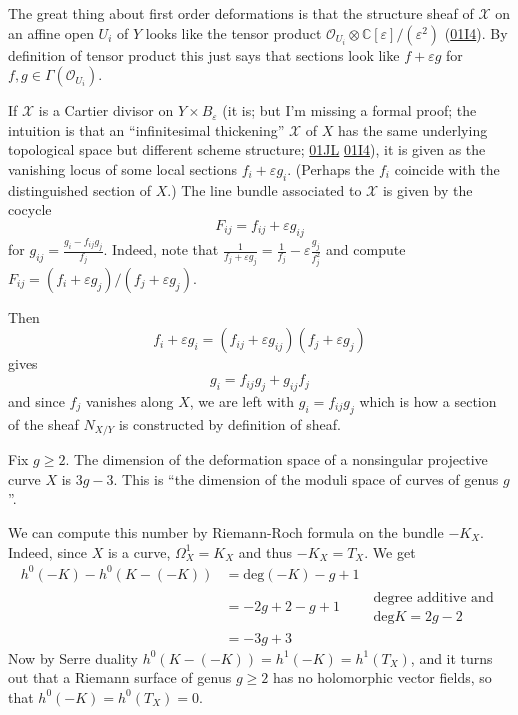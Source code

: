 The great thing about first order
deformations
is that the structure sheaf of $\mathcal{X}$
on an affine open $U_i$ of $Y$
looks like the tensor product
$\mathcal{O}_{U_i}\otimes
\mathbb{C}[\varepsilon]/(\varepsilon^2)$
(\href{https://stacks.math.columbia.edu/tag/%
01I4}{01I4}).
By definition of tensor product this just
says
that sections look like $f+\varepsilon g$
for $f,g \in \Gamma(\mathcal{O}_{U_i})$.

If $\mathcal{X}$ is a Cartier divisor on $Y
\times B_\varepsilon$
(it is; but I'm missing a formal proof;
the intuition is that an ``infinitesimal
thickening'' $\mathcal{X}$
of $X$ has the same underlying topological
space
but different scheme structure;
\href{https://stacks.math.columbia.edu/tag/%
01JL}{01JL}
\href{https://stacks.math.columbia.edu/tag/%
01I4}{01I4}),
it is given as the vanishing locus
of some local sections $f_i+\varepsilon g_i$.
(Perhaps the $f_i$ coincide with the
distinguished
section of $X$.)
The line bundle associated to $\mathcal{X}$
is given by the cocycle
$$
F_{ij}=f_{ij}+\varepsilon g_{ij}
$$
for $g_{ij}=\frac{g_i-f_{ij}g_j}{f_j}$.
Indeed, note that
$\frac{1}{f_j+\varepsilon
g_j}=\frac{1}{f_j}-\varepsilon
\frac{g_j}{f^2_j}$
and compute $F_{ij}=(f_i+\varepsilon
g_j)/(f_j+\varepsilon g_j)$.

Then
$$
f_i+\varepsilon g_i=(f_{ij}+\varepsilon
g_{ij})(f_j+\varepsilon g_j)
$$
gives
$$
g_i=f_{ij}g_j+g_{ij}f_j
$$
and since $f_j$ vanishes along $X$,
we are left with $g_i=f_{ij}g_j$
which is how a section of the sheaf $N_{X/Y}$
is constructed by definition of sheaf.


\begin{example}
\label{example-modul-space-nonsi-riema}
\begin{reference}
\cite[Example 3.1]{continued-fractions}
\end{reference}
Fix $g \geq 2$. The dimension of the
deformation space of a nonsingular
projective curve $X$ is $3g-3$. This is ``the
dimension of the moduli space of
curves of genus $g$''.

We can compute this number by Riemann-Roch
formula on the bundle $-K_X$.
Indeed, since $X$ is a curve,
$\Omega_X^1=K_X$ and thus $-K_X=T_X$. We get
$$
\begin{aligned}
h^0(-K)-h^0(K-(-K))&=\text{deg}(-K)-g+1\\
&=-2g+2-g+1\qquad \substack{\text{degree
additive and}\\ \text{deg}K=2g-2}\\
&=-3g+3
\end{aligned}
$$
Now by Serre duality
$h^0(K-(-K))=h^1(-K)=h^1(T_X)$, and it turns
out that a
Riemann surface of genus $g \geq 2$ has no
holomorphic vector fields, so that
$h^0(-K)=h^0(T_X)=0$.
\end{example}

